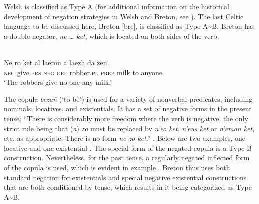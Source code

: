 ﻿\documentclass[output=paper]{langsci/langscibook}
\begin{document}
%
Welsh is classified as Type A (for additional information on the
historical development of negation strategies in Welsh and Breton, see
\citealt{Willis2013}). The last Celtic language to be discussed here,
Breton [bre], is classified as Type A{\textasciitilde}B. Breton has a double negator, \textit{ne … ket}, which is located on both sides of the verb:
%
\begin{exe}\ex
{}\\
    \gll Ne ro ket al laeron a laezh da zen. \\
\textsc{neg} give.\textsc{prs} \textsc{neg} \textsc{def} robber.\textsc{pl} \textsc{prep} milk  to anyone \\
    \glt `The robbers give no-one any milk.' 
    \end{exe}
%
The copula \textit{bezañ} (`to be') \parencite[144ff]{Press1986} is used
for a variety of nonverbal predicates, including nominals, locatives, and
existentials. It has a set of negative forms in the present tense: “There
is considerably more freedom where the verb is negative, the only strict
rule being that (\textit{a}) \textit{zo} must be replaced by \textit{n'eo
ket}, \textit{n'eus ket} or \textit{n'eman ket}, etc. as appropriate. There
is no form \textit{ne zo ket}.” \citep[152]{Press1986}. Below are two
examples, one locative  and one existential
. The special form of the negated copula is a
Type B construction. Nevertheless, for the past tense, a regularly negated
inflected form of the copula is used, which is evident in example
. Breton thus uses both standard negation for existentials and special negative existential constructions that are both conditioned by tense, which results in it being categorized as Type A{\textasciitilde}B.
%
\end{document}
